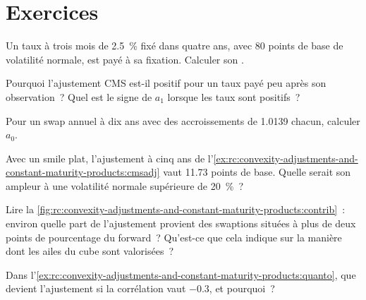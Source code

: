 \section{Exercices}

\begin{exercise}[$\star$]\label{exo:rc:convexity-adjustments-and-constant-maturity-products:1}
Un taux à trois mois de 2.5~\% fixé dans quatre ans, avec 80 points de base de
volatilité normale, est payé à sa fixation. Calculer son .
\end{exercise}

\begin{exercise}[$\star$]\label{exo:rc:convexity-adjustments-and-constant-maturity-products:2}
Pourquoi l'ajustement CMS est-il positif pour un taux payé peu après son observation~?
Quel est le signe de $a_1$ lorsque les taux sont positifs~?
\end{exercise}

\begin{exercise}[$\star$]\label{exo:rc:convexity-adjustments-and-constant-maturity-products:3}
Pour un swap annuel à dix ans avec des accroissements de 1.0139 chacun, calculer $a_0$.
\end{exercise}

\begin{exercise}[$\star\star$]\label{exo:rc:convexity-adjustments-and-constant-maturity-products:4}
Avec un smile plat, l'ajustement à cinq ans de l'\cref{ex:rc:convexity-adjustments-and-constant-maturity-products:cmsadj}
vaut 11.73 points de base. Quelle serait son ampleur à une volatilité normale supérieure de 20~\%~?
\end{exercise}

\begin{exercise}[$\star\star$]\label{exo:rc:convexity-adjustments-and-constant-maturity-products:5}
Lire la \cref{fig:rc:convexity-adjustments-and-constant-maturity-products:contrib}~:
environ quelle part de l'ajustement provient des swaptions situées à plus de deux
points de pourcentage du forward~? Qu'est-ce que cela indique sur la manière dont les
ailes du cube sont valorisées~?
\end{exercise}

\begin{exercise}[$\star\star$]\label{exo:rc:convexity-adjustments-and-constant-maturity-products:6}
Dans l'\cref{ex:rc:convexity-adjustments-and-constant-maturity-products:quanto}, que devient
l'ajustement si la corrélation vaut $-0.3$, et pourquoi~?
\end{exercise}

